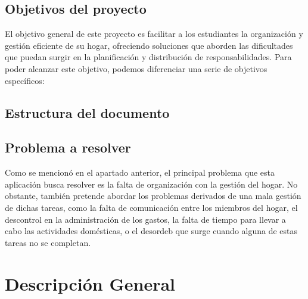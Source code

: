 \documentclass{article}
\begin{document}
\subsection{Objetivos del proyecto}

El objetivo general de este proyecto es facilitar a los estudiantes la organización y gestión eficiente de su hogar, ofreciendo soluciones que aborden las dificultades 
que puedan surgir en la planificación y distribución de responsabilidades. Para poder alcanzar este objetivo, podemos diferenciar una serie de objetivos específicos:


\subsection{Estructura del documento}



\subsection{Problema a resolver}

Como se mencionó en el apartado anterior, el principal problema que esta aplicación 
busca resolver es la falta de organización con la gestión del hogar. No obstante,
también pretende abordar los problemas derivados de una mala gestión de dichas tareas, 
como la falta de comunicación entre los miembros del hogar, el descontrol en la administración de los gastos, 
la falta de tiempo para llevar a cabo las actividades domésticas, o el desordeb que surge cuando alguna de estas tareas 
no se completan.




\section{Descripción General}
\end{document}
